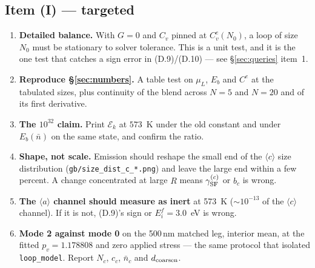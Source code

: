 \documentclass[11pt]{article}
\newcommand{\aloop}{\ensuremath{\langle a\rangle}}
\newcommand{\cloop}{\ensuremath{\langle c\rangle}}
\newcommand{\fbk}{\discretionary{}{}{}}   %
\newcommand{\file}[1]{\texttt{\small #1}}
\newcommand{\GSF}{\gamma_{\rm SF}}
\begin{document}
\subsection{Item (I) --- targeted}
\begin{enumerate}
\item \textbf{Detailed balance.}  With $G=0$ and $C_v$ pinned at
  $C_v^{e}(N_0)$, a loop of size $N_0$ must be stationary to solver tolerance.
  This is a unit test, and it is the one test that catches a sign error in
  (D.9)/(D.10) --- see \S\ref{sec:queries} item~1.
\item \textbf{Reproduce \S\ref{sec:numbers}.}  A table test on $\mu_L$, $E_b$
  and $C^{e}$ at the tabulated sizes, plus continuity of the blend across
  $N=5$ and $N=20$ and of its first derivative.
\item \textbf{The $10^{32}$ claim.}  Print $\mathcal E_k$ at $573$~K under the
  old constant and under $E_b(\bar n)$ on the same state, and confirm the
  ratio.
\item \textbf{Shape, not scale.}  Emission should reshape the small end of the
  \cloop{} size distribution (\file{gb/\fbk size\_\fbk dist\_\fbk c\_*.png})
  and leave the large end within a few percent.  A change concentrated at
  large $R$ means $\GSF^{(c)}$ or $b_c$ is wrong.
\item \textbf{The \aloop{} channel should measure as inert} at 573~K
  ($\sim10^{-13}$ of the \cloop{} channel).  If it is not, (D.9)'s sign or
  $E_i^{f}=3.0$~eV is wrong.
\item \textbf{Mode 2 against mode 0} on the 500\,nm matched leg, interior
  mean, at the fitted $p_v=1.178808$ and zero applied stress --- the same
  protocol that isolated \verb|loop_model|.  Report $N_c$, $c_c$, $\bar n_c$
  and $d_{\rm coarsen}$.
\end{enumerate}
\end{document}
